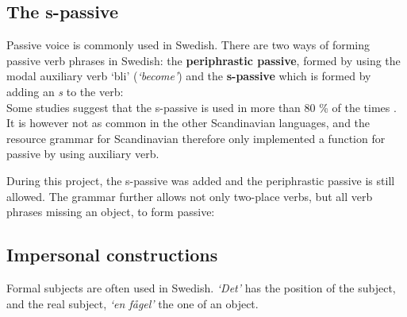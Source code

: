 \documentclass[10pt, a4paper]{article}
\begin{document}
\subsection{The s-passive}
Passive voice is commonly used in Swedish.
There are two ways of forming passive verb phrases in Swedish: the 
\textbf{periphrastic passive}, formed by using the modal auxiliary verb `bli'
(\emph{`become'}) and the \textbf{s-passive} which is formed by adding an
\emph{s} to the verb: \\
\label{sent:skrevs}
Some studies suggest that the s-passive is used in more than 80 \% of the times
\cite{laanemets}.
It is however not as common in the other Scandinavian languages,
and the resource grammar for Scandinavian therefore only implemented a function for
passive by using auxiliary verb.

During this project, the s-passive was added and the
periphrastic passive is still allowed.
The grammar further allows not only two-place verbs, but all verb phrases missing an object, to 
form passive:
\label{sent:give2pass}
\label{ex:passV33}
\label{ex:passV32}
\label{ex:passV2A}

\subsection{Impersonal constructions}
\label{sec:Formal}
Formal subjects \cite[]{SAG} are often used in
Swedish.
\emph{`Det'} has the position of the subject, and the real subject, 
\emph{`en f{\aa}gel'} the one of an object.
\end{document}
